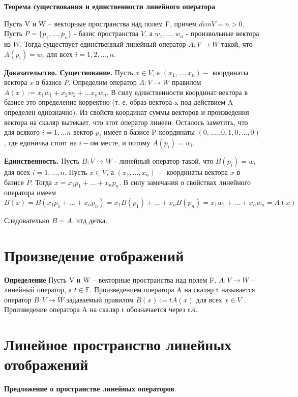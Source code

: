 \documentclass[a4paper]{article}
\begin{document}
{\begin{small}
\textbf{Теорема существования и единственности линейного оператора}

Пусть V и W – векторные пространства над полем F, причем $dim V = n > 0$. Пусть $P = \{ p_1, ..., p_n \}$ - базис пространства $V$, а $w_1, ..., w_n$ - произвольные вектора из $W$.  Тогда существует
единственный линейный оператор $A: V \rightarrow W$ такой, что $A(p_i) = w_i$ для всех $i = 1, 2, ..., n$.

\textbf{Доказательство. Существование.} Пусть $x \in V$, а $(x_1, ..., x_n) - $ координаты вектора $x$ в базисе $P$. Определим оператор $A: V \rightarrow W$ правилом $A(x) := x_1w_1+x_2w_2+...x_nw_n$. В силу единственности координат вектора в базисе это определение корректно (т. е. образ вектора x под действием A определен однозначно). Из свойств координат суммы векторов и произведения вектора на скаляр вытекает, что этот оператор
линеен. Осталось заметить, что для всякого $i = 1,...n$ вектор $p_i$ имеет в базисе P координаты $(0,....,0,1,0,...,0)$, где единичка стоит на $i-$ом месте, и потому $A(p_i) = w_i$.

\textbf{Единственность.} Пусть $B: V \rightarrow W$ - линейный оператор такой, что $B(p_i) = w_i$ для всех $i = 1,...,n$. Пусть $x \in V$, а $(x_1, ..., x_n) - $ координаты вектора $x$ в базисе $P$. Тогда $x = x_1p_1 + ... + x_np_n$. В силу замечания о свойствах линейного оператора имеем
\begin{equation}
B(x) = B(x_1p_1 + ... + x_np_n) = x_1B(p_1) + ... + x_nB(p_n) = x_1w_1 + ... + x_nw_n = A(x)
\end{equation}

Следовательно $B=A$. чтд детка.





\section*{Произведение отображений}
\textbf{Определение} Пусть V и W – векторные пространства над полем F, $A: V \rightarrow W$ –
линейный оператор, а $t \in \mathbb{F}$. Произведением оператора A на скаляр t
называется оператор $B: V \rightarrow W$ задаваемый правилом $B(x) := tA(x)$ для
всех $x \in V$ . Произведение оператора A на скаляр t обозначается через $tA$.


\section*{Линейное пространство линейных отображений}
\textbf{Предложение о пространстве линейных операторов}.


\end{small}}
\end{document}
